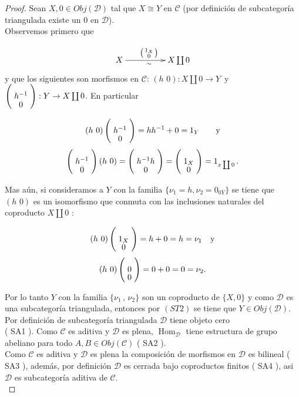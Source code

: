 \documentclass{article}
\newcommand{\spmat}[1]{%
  \left(\begin{smallmatrix}#1\end{smallmatrix}\right)%
}
\begin{document}
\begin{enumerate}
\begin{proof}
 Sean $X,0\in Obj(\mathscr{D})$ tal que $X\cong Y$ en $\mathscr{C}$ (por definición de subcategoría triangulada existe un $0$ en 
$\mathscr{D}$).\\

Observemos primero que

\begin{equation*}
\xymatrix@C+2pc{X\ar[r]_{\sim}^{\spmat{1_X \\ 0}}& X\coprod 0}\\
\end{equation*}
y que los siguientes son morfismos en $\mathscr{C}$:  $(h\,\,0): X\coprod 0\rightarrow Y$\,\,\,y\,\,\, 
$\left(\xymatrix@R=-1mm{h^{-1}\\0}\right):Y\rightarrow X\coprod 0$. En particular 

\[(h\,\,0) \left(\xymatrix@R=-1mm{h^{-1}\\0}\right)=hh^{-1} +0=1_Y\qquad \text{y}\]
\[\left(\xymatrix@R=-1mm{h^{-1}\\0}\right) (h\,\,0)=\left(\xymatrix@R=-1mm{h^{-1}h\\0}\right)
=\left(\xymatrix@R=-1mm{1_X\\0}\right)=1_{x\coprod 0}\,.\]

Mas aún, si consideramos a $Y$ con la familia $\{\nu_1=h, \nu_2=0_{0Y}\}$ se tiene que $(h\,\,0)$ es un isomorfismo que conmuta con las 
inclusiones naturales del coproducto $X\coprod 0$ :

\[(h\,\,0) \left(\xymatrix@R=-1mm{1_X\\0}\right)=h+0=h=\nu_1\quad \text{y}\]
\[(h\,\,0) \left(\xymatrix@R=-1mm{0\\0}\right)=0+0=0=\nu_2.\]

Por lo tanto $Y$ con la familia $\{\nu_1\,,\,\nu_2\}$ son un coproducto de $\{X,0\}$ y como $\mathscr{D}$ es una subcategoría triangulada, entonces 
por $( ST2 )$ se tiene que $Y\in Obj(\mathscr{D})$.\\

 Por definición de subcategoría triangulada $\mathscr{D}$ tiene objeto cero \\( SA1 ). Como $\mathscr{C}$ es aditiva y $\mathscr{D}$ es 
plena, $\operatorname{Hom}_{\mathscr{D}}$ tiene estructura de grupo abeliano para todo $A,B\in Obj(\mathscr{C})$ ( SA2 ).\\

Como $\mathscr{C}$ es aditiva y $\mathscr{D}$ es plena la composición de morfismos en $\mathscr{D}$ es bilineal ( SA3 ), además, por definición
$\mathscr{D}$ es cerrada bajo coproductos finitos ( SA4 ), asi $\mathscr{D}$ es  subcategoría aditiva de $\mathscr{C}$.\\


\end{proof}
\end{enumerate}
\end{document}
